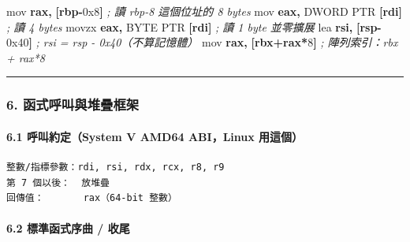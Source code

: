 \documentclass[10pt,a4paper]{article}
\newenvironment{Shaded}{\begin{snugshade}}{\end{snugshade}}
\newcommand{\BaseNTok}[1]{\textcolor[rgb]{0.00,0.00,0.81}{#1}}
\newcommand{\BuiltInTok}[1]{#1}
\newcommand{\CommentTok}[1]{\textcolor[rgb]{0.56,0.35,0.01}{\textit{#1}}}
\newcommand{\DataTypeTok}[1]{\textcolor[rgb]{0.13,0.29,0.53}{#1}}
\newcommand{\DecValTok}[1]{\textcolor[rgb]{0.00,0.00,0.81}{#1}}
\newcommand{\KeywordTok}[1]{\textcolor[rgb]{0.13,0.29,0.53}{\textbf{#1}}}
\newcommand{\OperatorTok}[1]{\textcolor[rgb]{0.81,0.36,0.00}{\textbf{#1}}}
\renewenvironment{Shaded}{%
  \def\FrameCommand{\fboxsep=3.2pt\colorbox{shadecolor}}%
  \MakeFramed{\advance\hsize-\width\FrameRestore\small}%
}{%
  \endMakeFramed
}
\begin{document}
\begin{Shaded}
\begin{Highlighting}[]
\BuiltInTok{mov}  \KeywordTok{rax}\OperatorTok{,} \OperatorTok{[}\KeywordTok{rbp}\OperatorTok{{-}}\BaseNTok{0x8}\OperatorTok{]}        \CommentTok{; 讀 rbp{-}8 這個位址的 8 bytes}
\BuiltInTok{mov}  \KeywordTok{eax}\OperatorTok{,} \DataTypeTok{DWORD} \DataTypeTok{PTR} \OperatorTok{[}\KeywordTok{rdi}\OperatorTok{]}  \CommentTok{; 讀 4 bytes}
\BuiltInTok{movzx} \KeywordTok{eax}\OperatorTok{,} \DataTypeTok{BYTE} \DataTypeTok{PTR} \OperatorTok{[}\KeywordTok{rdi}\OperatorTok{]}  \CommentTok{; 讀 1 byte 並零擴展}
\BuiltInTok{lea}  \KeywordTok{rsi}\OperatorTok{,} \OperatorTok{[}\KeywordTok{rsp}\OperatorTok{{-}}\BaseNTok{0x40}\OperatorTok{]}       \CommentTok{; rsi = rsp {-} 0x40（不算記憶體）}
\BuiltInTok{mov}  \KeywordTok{rax}\OperatorTok{,} \OperatorTok{[}\KeywordTok{rbx}\OperatorTok{+}\KeywordTok{rax}\OperatorTok{*}\DecValTok{8}\OperatorTok{]}      \CommentTok{; 陣列索引：rbx + rax*8}
\end{Highlighting}
\end{Shaded}

\begin{center}\rule{0.5\linewidth}{0.5pt}\end{center}

\subsubsection{6.
函式呼叫與堆疊框架}\label{ux51fdux5f0fux547cux53ebux8207ux5806ux758aux6846ux67b6}

\paragraph{6.1 呼叫約定（System V AMD64 ABI，Linux
用這個）}\label{ux547cux53ebux7d04ux5b9asystem-v-amd64-abilinux-ux7528ux9019ux500b}

\begin{Verbatim}[breaklines=true,breakanywhere=true,breakautoindent=false,fontsize=\fontsize{7.0}{9.5}\selectfont]
整數/指標參數：rdi, rsi, rdx, rcx, r8, r9
第 7 個以後：  放堆疊
回傳值：       rax（64-bit 整數）
\end{Verbatim}

\paragraph{6.2 標準函式序曲 /
收尾}\label{ux6a19ux6e96ux51fdux5f0fux5e8fux66f2-ux6536ux5c3e}
\end{document}
